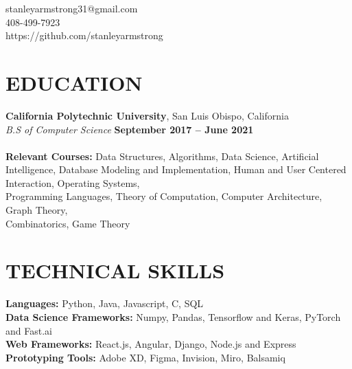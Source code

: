 \documentclass[margin,line]{resume}
\begin{document}
{
    \hfill stanleyarmstrong31@gmail.com       \vspace{0mm}\\\vspace{0mm}%
    \hfill 408-499-7923           \vspace{0mm}\\\vspace{0mm}%
    \hfill https://github.com/stanleyarmstrong \vspace{0mm}\\\vspace{-9mm}%
}

\begin{resume}
    \section{\mysidestyle \textbf{\large{E}\small{DUCATION}}}

    \textbf{\listing California Polytechnic University}, San Luis Obispo, California \vspace{1mm}\\
    \textsl{B.S of Computer Science} \hfill \textbf{September 2017 -- June 2021}\vspace{-3mm}\\\vspace{-1mm}%
    \\
    \textbf{Relevant Courses:} Data Structures, Algorithms, Data Science, Artificial Intelligence, Database Modeling and Implementation, Human and User Centered Interaction, Operating Systems,\\
    Programming Languages, Theory of Computation, Computer Architecture, Graph Theory,\\
    Combinatorics, Game Theory

    \vspace{-1mm}
\sectionline

    \section{\mysidestyle \textbf{\large{T}\small{ECHNICAL }\large{S}\small{KILLS}}}
    \textbf{Languages:} Python, Java, Javascript, C, SQL\\
    \textbf{Data Science Frameworks:} Numpy, Pandas, Tensorflow and Keras, PyTorch and Fast.ai\\
    \textbf{Web Frameworks:} React.js, Angular, Django, Node.js and Express\\
    \textbf{Prototyping Tools:} Adobe XD, Figma, Invision, Miro, Balsamiq


\end{resume}
\end{document}
